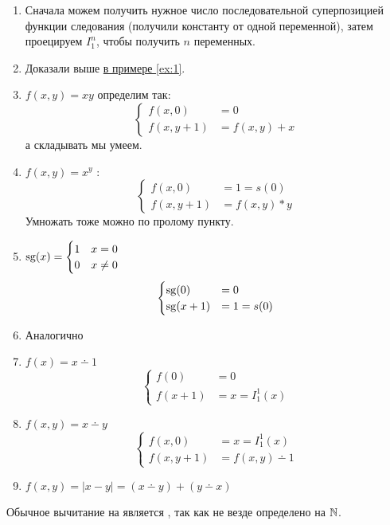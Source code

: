 \begin{proof*}
	\begin{enumerate}
		\item Сначала можем получить нужное число последовательной суперпозицией функции следования (получили константу от одной переменной), затем проецируем $ I^{n}_{1}$, чтобы получить $ n$ переменных.
		\item Доказали выше \hyperref[ex:1]{в примере \ref{ex:1}}.
		\item $ f(x, y) = xy$ определим так:
			\[
			\begin{cases}
				f(x, 0) &= 0\\
				f(x, y+1) &= f(x, y) + x
			\end{cases}
			\] 
			а складывать мы умеем.
		\item $ f(x, y) = x^{y}$ :
			\[
			\begin{cases}
				f(x, 0) &= 1 = s(0) \\
				f(x, y+1) &= f(x, y) * y
			\end{cases}
			\] 
			Умножать тоже можно по пролому пункту.
		\item  $ \operatorname{sg}(x) = \begin{cases}
				1&x=0 \\
				0& x\ne 0
		\end{cases}$
		\[
		\begin{cases}
			\operatorname{sg}(0) &= 0 \\
			\operatorname{sg}(x+1) &= 1 = s(0)
		\end{cases}
		\] 
	\item Аналогично
	\item $ f(x) = x \dotminus 1$ 
		\[
		\begin{cases}
			f(0) &=0 \\
			f(x+1) &= x = I^{1}_{1} (x)
		\end{cases}
		\] 
	\item $ f(x, y) = x \dotminus y$
		\[
		\begin{cases}
			f(x, 0) &= x = I^{1}_{1}(x)  \\
			f(x, y+1) &= f(x, y) \dotminus 1
		\end{cases}
		\] 
	\item $ f(x, y) = \lvert x - y \rvert  = (x \dotminus y) + (y \dotminus x)$
    \end{enumerate}
\end{proof*}
\begin{note}
    Обычное вычитание на является \prf, так как не везде определено на $ \mathbb{N}$.
\end{note}


